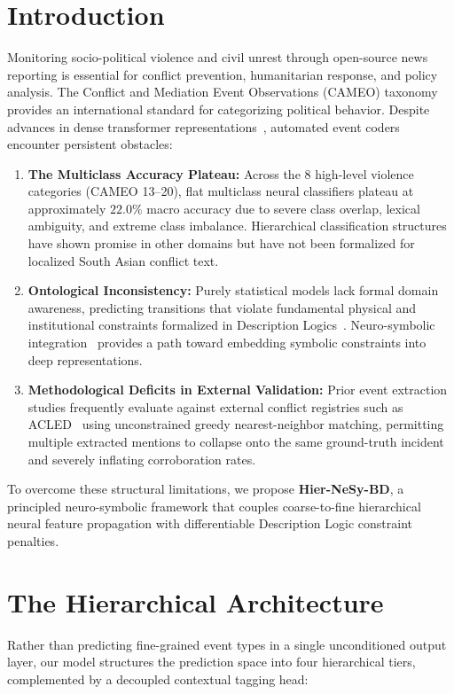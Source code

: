 \documentclass[11pt,a4paper]{article}
\begin{document}
\section{Introduction}
Monitoring socio-political violence and civil unrest through open-source news reporting is essential for conflict prevention, humanitarian response, and policy analysis. The Conflict and Mediation Event Observations (CAMEO) taxonomy~\cite{gerner2002conflict} provides an international standard for categorizing political behavior. Despite advances in dense transformer representations~\cite{devlin2019bert,reimers2019sentence}, automated event coders encounter persistent obstacles:
\begin{enumerate}
    \item \textbf{The Multiclass Accuracy Plateau:} Across the 8 high-level violence categories (CAMEO 13--20), flat multiclass neural classifiers plateau at approximately $22.0\%$ macro accuracy due to severe class overlap, lexical ambiguity, and extreme class imbalance. Hierarchical classification structures~\cite{silla2011survey} have shown promise in other domains but have not been formalized for localized South Asian conflict text.
    \item \textbf{Ontological Inconsistency:} Purely statistical models lack formal domain awareness, predicting transitions that violate fundamental physical and institutional constraints formalized in Description Logics~\cite{baader2003description}. Neuro-symbolic integration~\cite{badreddine2022logic,manhaeve2018deepproblog} provides a path toward embedding symbolic constraints into deep representations.
    \item \textbf{Methodological Deficits in External Validation:} Prior event extraction studies frequently evaluate against external conflict registries such as ACLED~\cite{raleigh2010introducing} using unconstrained greedy nearest-neighbor matching, permitting multiple extracted mentions to collapse onto the same ground-truth incident and severely inflating corroboration rates.
\end{enumerate}

To overcome these structural limitations, we propose \textbf{Hier-NeSy-BD}, a principled neuro-symbolic framework that couples coarse-to-fine hierarchical neural feature propagation with differentiable Description Logic constraint penalties.

\section{The Hierarchical Architecture}
Rather than predicting fine-grained event types in a single unconditioned output layer, our model structures the prediction space into four hierarchical tiers, complemented by a decoupled contextual tagging head:
\end{document}
